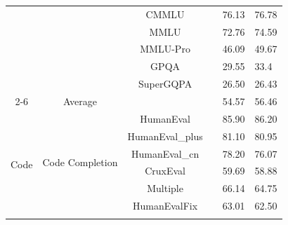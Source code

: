 \begin{table}[h]
\begin{tabular}{ccccll}
                                     &                                                                                                 & CMMLU               &  & 76.13 & 76.78 \\
                                     &                                                                                                 & MMLU                &  & 72.76 & 74.59 \\
                                     &                                                                                                 & MMLU-Pro           &  & 46.09 & 49.67 \\
                                     &                                                                                                 & GPQA                &  & 29.55 & 33.4  \\
                                     &                                                                                                 & SuperGQPA           &  & 26.50  & 26.43 \\ \cmidrule{2-6} 
                                     & {Average}                                                                                &                     &  & 54.57 & 56.46 \\ \midrule
\multirow{18}{*}{{Code}}      & \multirow{6}{*}{{Code Completion}}                                                       & HumanEval           &  & 85.90  & 86.20  \\
                                     &                                                                                                 & HumanEval\_plus     &  & 81.10  & 80.95 \\
                                     &                                                                                                 & HumanEval\_cn       &  & 78.20  & 76.07 \\
                                     &                                                                                                 & CruxEval            &  & 59.69 & 58.88 \\
                                     &                                                                                                 & Multiple            &  & 66.14 & 64.75 \\
                                     &                                                                                                 & HumanEvalFix        &  & 63.01 & 62.50  \\ \cmidrule{2-6} 

\end{tabular}
\end{table}
